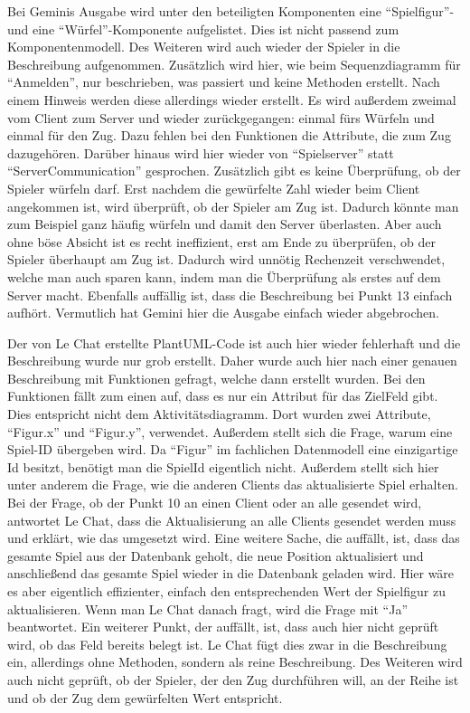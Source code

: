 Bei Geminis Ausgabe wird unter den beteiligten Komponenten eine ``Spielfigur''- und eine ``Würfel''-Komponente aufgelistet. Dies ist nicht 
passend zum Komponentenmodell. Des Weiteren wird auch wieder der Spieler in die Beschreibung aufgenommen. Zusätzlich wird hier, 
wie beim Sequenzdiagramm für ``Anmelden'', nur beschrieben, was passiert und keine Methoden erstellt. Nach einem Hinweis werden diese 
allerdings wieder erstellt. Es wird außerdem zweimal vom Client zum Server und wieder zurückgegangen: einmal fürs Würfeln und einmal 
für den Zug. Dazu fehlen bei den Funktionen die Attribute, die zum Zug dazugehören. Darüber hinaus wird hier wieder von ``Spielserver'' 
statt ``ServerCommunication'' gesprochen. Zusätzlich gibt es keine Überprüfung, ob der Spieler würfeln darf. Erst nachdem die gewürfelte 
Zahl wieder beim Client angekommen ist, wird überprüft, ob der Spieler am Zug ist. Dadurch könnte man zum Beispiel ganz häufig würfeln 
und damit den Server überlasten. Aber auch ohne böse Absicht ist es recht ineffizient, erst am Ende zu überprüfen, ob der Spieler 
überhaupt am Zug ist. Dadurch wird unnötig Rechenzeit verschwendet, welche man auch sparen kann, indem man die Überprüfung als erstes 
auf dem Server macht. Ebenfalls auffällig ist, dass die Beschreibung bei Punkt 13 einfach aufhört. Vermutlich hat Gemini hier die 
Ausgabe einfach wieder abgebrochen.

Der von Le Chat erstellte PlantUML-Code ist auch hier wieder fehlerhaft und die Beschreibung wurde nur grob erstellt. Daher wurde 
auch hier nach einer genauen Beschreibung mit Funktionen gefragt, welche dann erstellt wurden. Bei den Funktionen fällt zum einen auf, 
dass es nur ein Attribut für das ZielFeld gibt. Dies entspricht nicht dem Aktivitätsdiagramm. Dort wurden zwei Attribute, ``Figur.x'' 
und ``Figur.y'', verwendet. Außerdem stellt sich die Frage, warum eine Spiel-ID übergeben wird. Da ``Figur'' im fachlichen Datenmodell eine 
einzigartige Id besitzt, benötigt man die SpielId eigentlich nicht. Außerdem stellt sich hier unter anderem die Frage, wie die anderen 
Clients das aktualisierte Spiel erhalten. Bei der Frage, ob der Punkt 10 an einen Client oder an alle gesendet wird, antwortet Le 
Chat, dass die Aktualisierung an alle Clients gesendet werden muss und erklärt, wie das umgesetzt wird. Eine weitere Sache, die 
auffällt, ist, dass das gesamte Spiel aus der Datenbank geholt, die neue Position aktualisiert und anschließend das gesamte 
Spiel wieder in die Datenbank geladen wird. Hier wäre es aber eigentlich effizienter, einfach den entsprechenden Wert der Spielfigur 
zu aktualisieren. Wenn man Le Chat danach fragt, wird die Frage mit ``Ja'' beantwortet. Ein weiterer Punkt, der auffällt, ist, dass auch 
hier nicht geprüft wird, ob das Feld bereits belegt ist. Le Chat fügt dies zwar in die Beschreibung ein, allerdings ohne Methoden, 
sondern als reine Beschreibung. Des Weiteren wird auch nicht geprüft, ob der Spieler, der den Zug durchführen will, an der Reihe ist 
und ob der Zug dem gewürfelten Wert entspricht.

